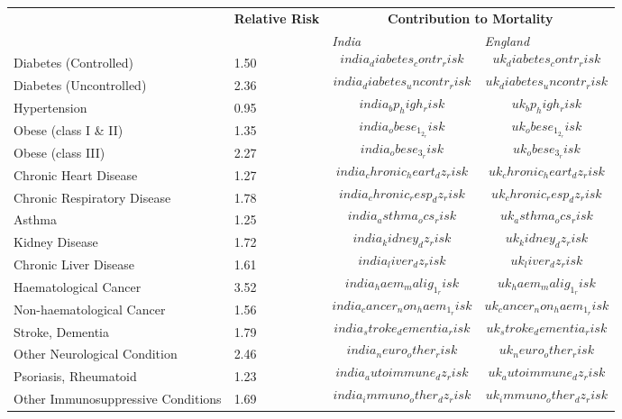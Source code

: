 \begin{tabular}{p{6cm}p{1.5cm}p{2cm}p{2cm}}
& \textbf{Relative \newline Risk} & \multicolumn{2}{c}{\textbf{Contribution to Mortality}} \\[-1.5ex]
& & \emph{India} & \emph{England} \\[2ex]
Diabetes (Controlled) & 1.50 & $$india_diabetes_contr_risk$$ & $$uk_diabetes_contr_risk$$ \\[0.25ex]
Diabetes (Uncontrolled) & 2.36 & $$india_diabetes_uncontr_risk$$ & $$uk_diabetes_uncontr_risk$$ \\[0.25ex]
Hypertension & 0.95 & $$india_bp_high_risk$$ & $$uk_bp_high_risk$$ \\[0.25ex]
Obese (class I \& II) & 1.35 & $$india_obese_1_2_risk$$ & $$uk_obese_1_2_risk$$ \\[0.25ex]
Obese (class III) & 2.27 & $$india_obese_3_risk$$ & $$uk_obese_3_risk$$ \\[0.25ex]
Chronic Heart Disease & 1.27 & $$india_chronic_heart_dz_risk$$ & $$uk_chronic_heart_dz_risk$$ \\[0.25ex]
Chronic Respiratory Disease & 1.78 & $$india_chronic_resp_dz_risk$$ & $$uk_chronic_resp_dz_risk$$ \\[0.25ex]
Asthma & 1.25 & $$india_asthma_ocs_risk$$ & $$uk_asthma_ocs_risk$$ \\[0.25ex]
Kidney Disease & 1.72 & $$india_kidney_dz_risk$$ & $$uk_kidney_dz_risk$$ \\[0.25ex]
Chronic Liver Disease & 1.61 & $$india_liver_dz_risk$$ & $$uk_liver_dz_risk$$ \\[0.25ex]
Haematological Cancer & 3.52 & $$india_haem_malig_1_risk$$ & $$uk_haem_malig_1_risk$$ \\[0.25ex]
Non-haematological Cancer & 1.56 & $$india_cancer_non_haem_1_risk$$ & $$uk_cancer_non_haem_1_risk$$ \\[0.25ex]
Stroke, Dementia & 1.79 & $$india_stroke_dementia_risk$$ & $$uk_stroke_dementia_risk$$ \\[0.25ex]
Other Neurological Condition & 2.46 & $$india_neuro_other_risk$$ & $$uk_neuro_other_risk$$ \\[0.25ex]
Psoriasis, Rheumatoid & 1.23 & $$india_autoimmune_dz_risk$$ & $$uk_autoimmune_dz_risk$$ \\[0.25ex]
Other Immunosuppressive Conditions & 1.69 & $$india_immuno_other_dz_risk$$ & $$uk_immuno_other_dz_risk$$ \\[0.25ex]
\end{tabular}

